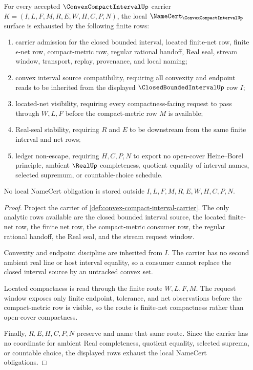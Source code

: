 \begin{theorem}
\label{thm:convex-compact-interval-namecert-obligations}
For every accepted $\ConvexCompactIntervalUp$ carrier $K=(I,L,F,M,R,E,W,H,C,P,N)$, the local $\NameCert_{\ConvexCompactIntervalUp}$ surface is exhausted by the following finite rows:
\begin{enumerate}
\item carrier admission for the closed bounded interval, located finite-net row, finite $\epsilon$-net row, compact-metric row, regular rational handoff, Real seal, stream window, transport, replay, provenance, and local naming;
\item convex interval source compatibility, requiring all convexity and endpoint reads to be inherited from the displayed $\ClosedBoundedIntervalUp$ row $I$;
\item located-net visibility, requiring every compactness-facing request to pass through $W,L,F$ before the compact-metric row $M$ is available;
\item Real-seal stability, requiring $R$ and $E$ to be downstream from the same finite interval and net rows;
\item ledger non-escape, requiring $H,C,P,N$ to export no open-cover Heine--Borel principle, ambient $\RealUp$ completeness, quotient equality of interval names, selected supremum, or countable-choice schedule.
\end{enumerate}
No local NameCert obligation is stored outside $I,L,F,M,R,E,W,H,C,P,N$.
\end{theorem}
\begin{proof}
Project the carrier of \autoref{def:convex-compact-interval-carrier}. The only analytic rows available are the closed bounded interval source, the located finite-net row, the finite net row, the compact-metric consumer row, the regular rational handoff, the Real seal, and the stream request window.

Convexity and endpoint discipline are inherited from $I$. The carrier has no second ambient real line or host interval equality, so a consumer cannot replace the closed interval source by an untracked convex set.

Located compactness is read through the finite route $W,L,F,M$. The request window exposes only finite endpoint, tolerance, and net observations before the compact-metric row is visible, so the route is finite-net compactness rather than open-cover compactness.

Finally, $R,E,H,C,P,N$ preserve and name that same route. Since the carrier has no coordinate for ambient Real completeness, quotient equality, selected suprema, or countable choice, the displayed rows exhaust the local NameCert obligations.
\end{proof}

